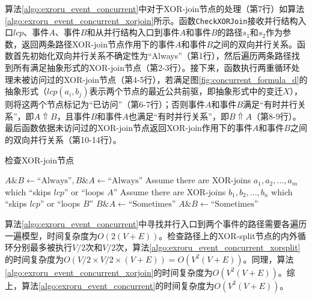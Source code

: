 算法\ref{algo:exroru_event_concurrent}中对于XOR-join节点的处理（第7行）如算法\ref{algo:exroru_event_concurrent_xorjoin}所示。函数\texttt{CheckXORJoin}接收并行结构入口$lcp$、事件$A$、事件$B$和从并行结构入口到事件$A$和事件$B$的路径$s_{1}$和$s_{2}$作为参数，返回两条路径XOR-join节点作用下的事件$A$和事件$B$之间的双向并行关系。函数首先初始化双向并行关系不确定性为“Always”（第1行），然后遍历两条路径找到所有满足抽象形式的XOR-join节点（第2-3行）。接下来，函数执行两重循环处理未被访问过的XOR-join节点（第4-5行），若满足图\ref{fig:concurrent_formula_d}的抽象形式（$lcp(a_{i},b_{j})$表示两个节点的最近公共前驱，即抽象形式中的变迁$X$），则将这两个节点标记为“已访问”（第6-7行）；否则事件$A$和事件$B$满足“有时并行关系”，即$A\Uparrow B$，且事件$B$和事件$A$也满足“有时并行关系”，即$B\Uparrow A$（第8-9行）。最后函数依据未访问过的XOR-join节点返回XOR-join作用下的事件$A$和事件$B$之间的双向并行关系（第10-14行）。

\begin{algorithm}[htbp]
  \LinesNumbered
  \caption{检查XOR-join节点}
  \label{algo:exroru_event_concurrent_xorjoin}
   {
    \nl $A\&B\leftarrow\text{``Always''},B\&A\leftarrow\text{``Always''}$\;
    \nl Assume there are XOR-joins $a_{1},a_{2},...,a_{m}$ which ``skips $lcp$'' or ``loops $A$''\;
    \nl Assume there are XOR-joins $b_{1},b_{2},...,b_{n}$ which ``skips $lcp$'' or ``loops $B$''\;
    \nl {} {
      \nl {} {
        \nl {} {
  	      \nl {}
        } \nl {}
      }
    }
    \nl {} {
  	  \nl $B\&A\leftarrow\text{``Sometimes''}$\;
  	}
  	\nl {} {
  	  \nl $A\&B\leftarrow\text{``Sometimes''}$\;
  	}
  	\nl {}
  }
\end{algorithm}

算法\ref{algo:exroru_event_concurrent}中寻找并行入口到两个事件的路径需要各遍历一遍模型，时间复杂度为$O(2(V+E))$。检查路径上的XOR-split节点的内外循环分别最多被执行$V/2$次和$V/2$次，算法\ref{algo:exroru_event_concurrent_xorsplit}的时间复杂度为$O(V/2\times V/2\times(V+E))=O(V^{2}(V+E))$。同理，算法\ref{algo:exroru_event_concurrent_xorjoin}的时间复杂度为$O(V^{2}(V+E))$。综上，算法\ref{algo:exroru_event_concurrent}的时间复杂度为$O(V^{2}(V+E))$。

